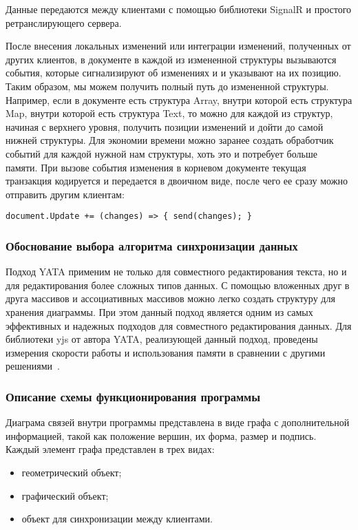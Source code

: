 \documentclass[a4paper,12pt]{article}
\begin{document}
    Данные передаются между клиентами с помощью библиотеки SignalR и простого ретранслирующего сервера.

    После внесения локальных изменений или интеграции изменений, полученных от других клиентов, в документе в каждой из измененной структуры вызываются события, которые сигнализируют об изменениях и и указывают на их позицию. Таким образом, мы можем получить полный путь до измененной структуры. Например, если в документе есть структура Array, внутри которой есть структура Map, внутри которой есть структура Text, то можно для каждой из структур, начиная с верхнего уровня, получить позиции изменений и дойти до самой нижней структуры. Для экономии времени можно заранее создать обработчик событий для каждой нужной нам структуры, хоть это и потребует больше памяти. При вызове события изменения в корневом документе текущая транзакция кодируется и передается в двоичном виде, после чего ее сразу можно отправить другим клиентам:

    \begin{verbatim}
document.Update += (changes) => { send(changes); }
    \end{verbatim}

    \subsubsection{Обоснование выбора алгоритма синхронизации данных}
    Подход YATA применим не только для совместного редактирования текста, но и для редактирования более сложных типов данных. С помощью вложенных друг в друга массивов и ассоциативных массивов можно легко создать структуру для хранения диаграммы. При этом данный подход является одним из самых эффективных и надежных подходов для совместного редактирования данных. Для библиотеки yjs от автора YATA, реализующей данный подход, проведены измерения скорости работы и использования памяти в сравнении с другими решениями~\cite{YATATest}.

    \subsubsection{Описание схемы функционирования программы}
    Диаграма связей внутри программы представлена в виде графа с дополнительной информацией, такой как положение вершин, их форма, размер и подпись. Каждый элемент графа представлен в трех видах:

    \begin{itemize}
        \item геометрический объект;
        \item графический объект;
        \item объект для синхронизации между клиентами.
    \end{itemize}
\end{document}
